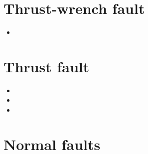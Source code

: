 \section{Thrust-wrench fault} 

\begin{small}
\begin{itemize}
\item[\twothousandfifteen] 
\end{itemize}
\end{small}

\section{Thrust fault} 

\begin{small}
\begin{itemize}
\item[\nineteenninety] 
\item[\nineteenninetytwo] 
\item[\twothousandfourteen] 
\end{itemize}
\end{small}

\section{Normal faults} 

